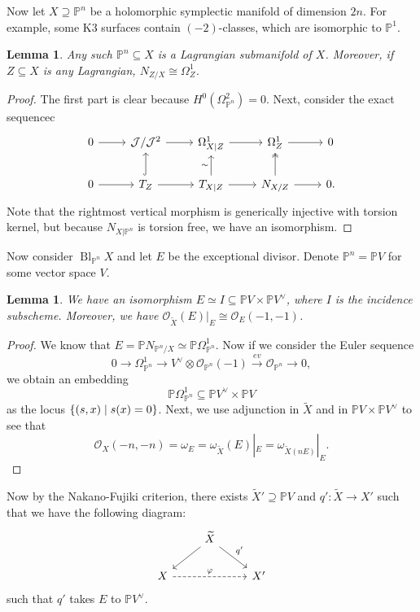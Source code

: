 \documentclass[leqno, openany]{memoir}
\newtheorem{lem}[thm]{Lemma}
\theoremstyle{definition}
\theoremstyle{remark}
\theoremstyle{plain}
\theoremstyle{definition}
\theoremstyle{remark}
\renewcommand{\P}{\mathbb{P}}
\newcommand{\mc}[1]{\mathcal{#1}}
\newcommand{\wt}[1]{\widetilde{#1}}
\DeclareMathOperator{\Bl}{Bl}
\begin{document}
Now let $X \supseteq \P^n$ be a holomorphic symplectic manifold of dimension $2n$. For example, some K3 surfaces contain $(-2)$-classes, which are isomorphic to $\P^1$.

\begin{lem}
    Any such $\P^n \subseteq X$ is a Lagrangian submanifold of $X$. Moreover, if $Z \subseteq X$ is any Lagrangian, $N_{Z/X} \cong \Omega^1_{Z}$.
\end{lem}

\begin{proof}
    The first part is clear because $H^0(\Omega^2_{\P^n}) = 0$. Next, consider the exact sequencec
    \begin{equation*}
    \begin{tikzcd}
        0 \ar{r} & \mc{J}/\mc{J}^2 \ar{r} & \Omega^1_{X|Z} \ar{r} & \Omega^1_{Z} \ar{r} & 0 \\
        0 \ar{r} & T_{Z} \ar{r} \ar[hookrightarrow]{u} & T_{X|Z} \ar{u}{\sim} \ar{r} & N_{X/Z} \ar{r} \ar[twoheadrightarrow]{u} & 0.
    \end{tikzcd}
    \end{equation*}
    Note that the rightmost vertical morphism is generically injective with torsion kernel, but because $N_{X|\P^n}$ is torsion free, we have an isomorphism.
\end{proof}

Now consider $\Bl_{\P^n} X$ and let $E$ be the exceptional divisor. Denote $\P^n = \P V$ for some vector space $V$.

\begin{lem}
    We have an isomorphism $E \simeq I \subseteq \P V \times \P V^{\vee}$, where $I$ is the incidence subscheme. Moreover, we have $\mc{O}_{\wt{X}}(E) |_E \cong \mc{O}_E(-1, -1)$.
\end{lem}

\begin{proof}
    We know that $E = \P N_{\P^n/X} \simeq \P \Omega^1_{\P^n}$. Now if we consider the Euler sequence
    \[ 0 \to \Omega^1_{\P^n} \to V^{\vee} \otimes \mc{O}_{\P^n}(-1) \xrightarrow{ev} \mc{O}_{\P^n} \to 0, \]
    we obtain an embedding
    \[ \P \Omega^1_{\P^n} \subseteq \P V^{\vee} \times \P V \]
    as the locus $\qty{(s,x) \mid s(x) = 0}$. Next, we use adjunction in $\wt{X}$ and in $\P V \times \P V^{\vee}$ to see that
    \[ \mc{O}_X(-n, -n) = \omega_E = \omega_{\wt{X}}(E)|_E = \omega_{\wt{X}(nE)}|_E. \]
\end{proof}

Now by the Nakano-Fujiki criterion, there exists $\wt{X}' \supseteq \P V$ and $q' \colon \wt{X} \to X'$ such that we have the following diagram:
\begin{equation*}
\begin{tikzcd}
    & \wt{X} \ar{dl} \ar{dr}{q'} \\
    X \ar[dashrightarrow]{rr}{\varphi} & & X'
\end{tikzcd}
\end{equation*}
such that $q'$ takes $E$ to $\P V^{\vee}$.
\end{document}
